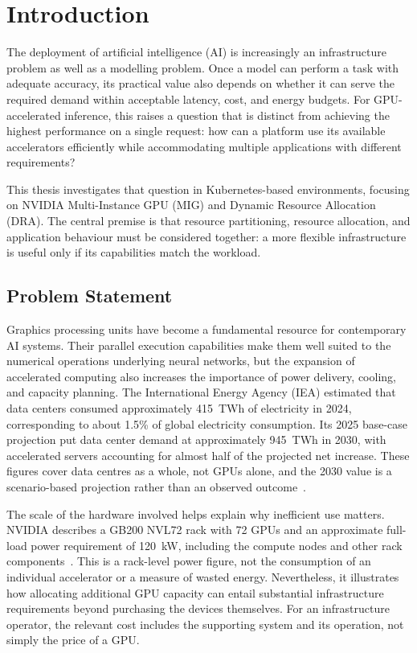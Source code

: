 \chapter{Introduction}
\label{chap:introduction}

The deployment of artificial intelligence (AI) is increasingly an infrastructure problem as well as a modelling problem. Once a model can perform a task with adequate accuracy, its practical value also depends on whether it can serve the required demand within acceptable latency, cost, and energy budgets. For GPU-accelerated inference, this raises a question that is distinct from achieving the highest performance on a single request: how can a platform use its available accelerators efficiently while accommodating multiple applications with different requirements?

This thesis investigates that question in Kubernetes-based environments, focusing on NVIDIA Multi-Instance GPU (MIG) and Dynamic Resource Allocation (DRA). The central premise is that resource partitioning, resource allocation, and application behaviour must be considered together: a more flexible infrastructure is useful only if its capabilities match the workload.

\section{Problem Statement}
\label{sec:problem-statement}

Graphics processing units have become a fundamental resource for contemporary AI systems. Their parallel execution capabilities make them well suited to the numerical operations underlying neural networks, but the expansion of accelerated computing also increases the importance of power delivery, cooling, and capacity planning. The International Energy Agency (IEA) estimated that data centers consumed approximately 415~TWh of electricity in 2024, corresponding to about 1.5\% of global electricity consumption. Its 2025 base-case projection put data center demand at approximately 945~TWh in 2030, with accelerated servers accounting for almost half of the projected net increase. These figures cover data centres as a whole, not GPUs alone, and the 2030 value is a scenario-based projection rather than an observed outcome~\cite{iea2025energyai}.

The scale of the hardware involved helps explain why inefficient use matters. NVIDIA describes a GB200 NVL72 rack with 72 GPUs and an approximate full-load power requirement of 120~kW, including the compute nodes and other rack components~\cite{nvidia2026rackpower}. This is a rack-level power figure, not the consumption of an individual accelerator or a measure of wasted energy. Nevertheless, it illustrates how allocating additional GPU capacity can entail substantial infrastructure requirements beyond purchasing the devices themselves. For an infrastructure operator, the relevant cost includes the supporting system and its operation, not simply the price of a GPU.

